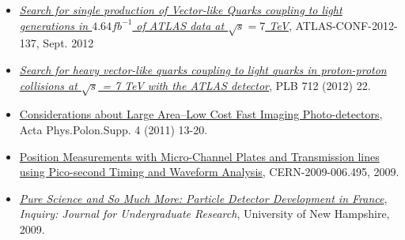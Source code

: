 \documentclass[10pt]{article}
\begin{document}
\begin{itemize}
\item \href{https://cds.cern.ch/record/1480628}{\textit{Search for single production of Vector-like Quarks coupling to light generations in $4.64fb^{-1}$ of ATLAS data at $\sqrt{s} = 7$ TeV}}, ATLAS-CONF-2012-137, Sept. 2012

\item \href{http://arxiv.org/abs/1112.5755}{\textit{Search for heavy vector-like quarks coupling to light quarks in proton-proton collisions at $\sqrt{s}$ = 7 TeV with the ATLAS detector}}, PLB 712 (2012) 22.

\item \href{http://www.actaphys.uj.edu.pl/fulltext?series=Sup&vol=4&page=13}{Considerations about Large Area–Low Cost Fast Imaging Photo-detectors}, Acta Phys.Polon.Supp. 4 (2011) 13-20.

\item \href{https://cds.cern.ch/record/1235871}{Position Measurements with Micro-Channel Plates and Transmission lines using Pico-second Timing and Waveform Analysis}, CERN-2009-006.495, 2009.

\item \href{http://scholars.unh.edu/inquiry_2009/12/}{\textit{Pure Science and So Much More: Particle Detector Development in France}}, \textit{Inquiry: Journal for Undergraduate Research},  University of New Hampshire, 2009.

\end{itemize}
\end{document}
